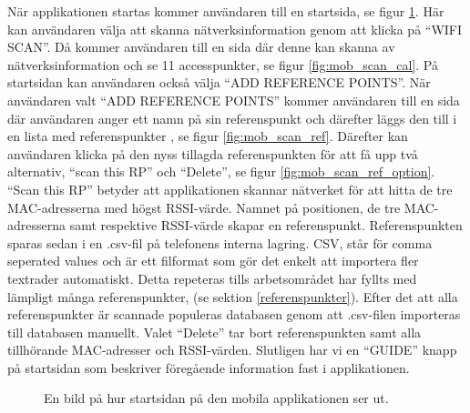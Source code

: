 \documentclass[a4paper,12pt]{article}
\begin{document}
 När applikationen startas kommer användaren till en startsida, se figur \ref{fig:mob_main}. Här kan användaren välja att skanna nätverksinformation genom att klicka på ``WIFI SCAN''. Då kommer användaren till en sida där denne kan skanna av nätverksinformation och se 11 accesspunkter, se figur \ref{fig:mob_scan_cal}. På startsidan kan användaren också välja ``ADD REFERENCE POINTS''. När användaren valt ``ADD REFERENCE POINTS'' kommer användaren till en sida där användaren anger ett namn på sin referenspunkt och därefter läggs den till i en lista med referenspunkter , se figur \ref{fig:mob_scan_ref}. Därefter kan användaren klicka på den nyss tillagda referenspunkten för att få upp två alternativ, ``scan this RP'' och ``Delete'', se figur \ref{fig:mob_scan_ref_option}. ``Scan this RP'' betyder att applikationen skannar nätverket för att hitta de tre MAC-adresserna med högst RSSI-värde. Namnet på positionen, de tre MAC-adresserna samt respektive RSSI-värde skapar en referenspunkt. Referenspunkten sparas sedan i en .csv-fil på telefonens interna lagring. CSV, står för comma seperated values och är ett filformat som gör det enkelt att importera fler textrader automatiskt. Detta repeteras tills arbetsområdet har fyllts med lämpligt många referenspunkter, (se sektion \ref{referenspunkter}). Efter det att alla referenspunkter är scannade populeras databasen genom att .csv-filen importeras till databasen manuellt. Valet ``Delete'' tar bort referenspunkten samt alla tillhörande MAC-adresser och RSSI-värden. Slutligen har vi en ``GUIDE'' knapp på startsidan som beskriver föregående information fast i applikationen.

 \begin{figure}[H]
   \centering
   \caption{En bild på hur startsidan på den mobila applikationen ser ut.}
   \label{fig:mob_main}
 \end{figure}
\end{document}
